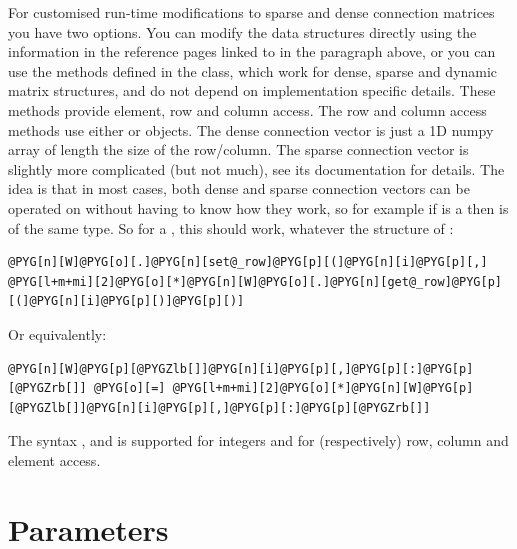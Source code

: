 \documentclass[letterpaper,10pt,english]{manual}
\begin{document}
For customised run-time modifications to sparse and dense connection matrices
you have two options. You can modify the data structures directly using the
information in the reference pages linked to in the paragraph above, or you can
use the methods defined in the \hyperlink{brian.ConnectionMatrix}{} class, which work for
dense, sparse and dynamic matrix structures, and do not depend on implementation
specific details. These methods provide element, row and column access. The
row and column access methods use either \hyperlink{brian.DenseConnectionVector}{}
or \hyperlink{brian.SparseConnectionVector}{} objects. The dense connection vector is just
a 1D numpy array of length the size of the row/column. The sparse connection
vector is slightly more complicated (but not much), see its documentation for
details. The idea is that in most cases, both dense and sparse connection vectors
can be operated on without having to know how they work, so for example if 
is a \hyperlink{brian.ConnectionVector}{} then  is of the same type. So for a
\hyperlink{brian.ConnectionMatrix}{} , this should work, whatever the structure of
:

\begin{Verbatim}[commandchars=@\[\]]
@PYG[n][W]@PYG[o][.]@PYG[n][set@_row]@PYG[p][(]@PYG[n][i]@PYG[p][,] @PYG[l+m+mi][2]@PYG[o][*]@PYG[n][W]@PYG[o][.]@PYG[n][get@_row]@PYG[p][(]@PYG[n][i]@PYG[p][)]@PYG[p][)]
\end{Verbatim}

Or equivalently:

\begin{Verbatim}[commandchars=@\[\]]
@PYG[n][W]@PYG[p][@PYGZlb[]]@PYG[n][i]@PYG[p][,]@PYG[p][:]@PYG[p][@PYGZrb[]] @PYG[o][=] @PYG[l+m+mi][2]@PYG[o][*]@PYG[n][W]@PYG[p][@PYGZlb[]]@PYG[n][i]@PYG[p][,]@PYG[p][:]@PYG[p][@PYGZrb[]]
\end{Verbatim}

The syntax ,  and  is supported for integers 
and  for (respectively) row, column and element access.

\resetcurrentobjects
\hypertarget{--doc-parameters}{}

\section{Parameters}
\end{document}

